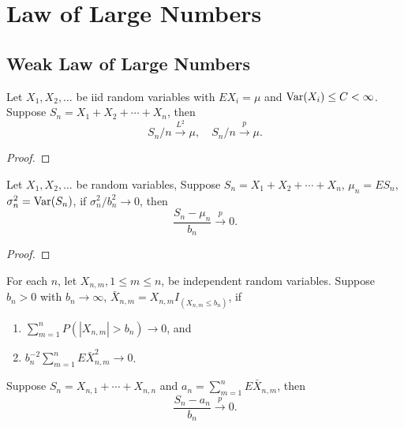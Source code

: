 \chapter{Law of Large Numbers}

\section{Weak Law of Large Numbers}

\begin{theorem}
	Let $X_1,X_2,\ldots$ be iid random variables with $EX_i=\mu$ and $\mathrm{Var}(X_i)\leq C<\infty$. Suppose $S_n=X_1+X_2+\cdots+X_n$, then
	\begin{equation}
		S_n/n\stackrel{L^2}{\rightarrow}\mu,\quad S_n/n\stackrel{p}{\rightarrow}\mu.
	\end{equation}
\end{theorem}

\begin{proof}

\end{proof}

\begin{theorem}
	Let $X_1,X_2,\ldots$ be random variables, Suppose $S_n=X_1+X_2+\cdots+X_n$, $\mu_n=ES_n$, $\sigma_n^2=\mathrm{Var}(S_n)$, if $\sigma_n^2/b_n^2\rightarrow 0$, then
	\begin{equation}
		\frac{S_n-\mu_n}{b_n}\stackrel{p}{\rightarrow}0.
	\end{equation}
\end{theorem}

\begin{proof}

\end{proof}

\begin{theorem}
	For each $n$, let $X_{n,m},1\leq m\leq n$, be independent random variables. Suppose $b_n>0$ with $b_n\rightarrow\infty$, $\bar{X}_{n,m}=X_{n,m}I_{\left(X_{n,m}\leq b_n\right)}$, if
	\begin{enumerate}
		\item $\sum_{m=1}^{n}P\left(\left|X_{n,m}\right|>b_{n}\right)\rightarrow 0$, and
		\item $b_{n}^{-2}\sum_{m=1}^{n}E\bar{X}_{n,m}^{2}\rightarrow 0$.
	\end{enumerate}
	Suppose $S_{n}=X_{n, 1}+\cdots+X_{n,n}$ and $a_{n}=\sum_{m=1}^{n}E\bar{X}_{n,m}$, then
	\begin{equation}
		\frac{S_n-a_n}{b_n}\stackrel{p}{\rightarrow}0.
	\end{equation}
\end{theorem}

